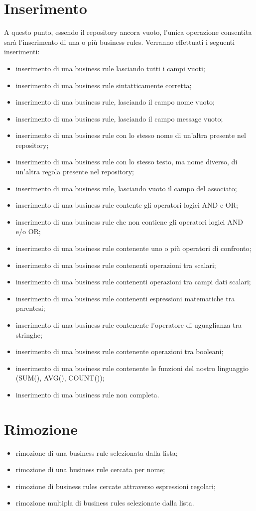 \chapter{Inserimento}
A questo punto, essendo il repository ancora vuoto, l'unica operazione consentita sar\`a l'inserimento di una o pi\`u business rules.
Verranno effettuati i seguenti inserimenti:
\begin{itemize}
\item inserimento di una business rule lasciando tutti i campi vuoti;
\item inserimento di una business rule sintatticamente corretta;
\item inserimento di una business rule, lasciando il campo nome vuoto;
\item inserimento di una business rule, lasciando il campo message vuoto;
\item inserimento di una business rule con lo stesso nome di un'altra presente nel repository;
\item inserimento di una business rule con lo stesso testo, ma nome diverso, di un'altra regola presente nel repository;
\item inserimento di una business rule, lasciando vuoto il campo del \bo associato;
\item inserimento di una business rule contente gli operatori logici AND e OR;
\item inserimento di una business rule che non contiene gli operatori logici AND e/o OR;
\item inserimento di una business rule contenente uno o pi\`u operatori di confronto;
\item inserimento di una business rule contenenti operazioni tra scalari;
\item inserimento di una business rule contenenti operazioni tra campi dati scalari;
\item inserimento di una business rule contenenti espressioni matematiche tra parentesi;
\item inserimento di una business rule contenente l'operatore di uguaglianza tra stringhe;
\item inserimento di una business rule contenente operazioni tra booleani;
\item inserimento di una business rule contenente le funzioni del nostro linguaggio (SUM(), AVG(), COUNT());
\item inserimento di una business rule non completa.
\end{itemize}
\chapter{Rimozione}
\begin{itemize}
\item rimozione di una business rule selezionata dalla lista;
\item rimozione di una business rule cercata per nome;
\item rimozione di business rules cercate attraverso espressioni regolari;
\item rimozione multipla di business rules selezionate dalla lista.
\end{itemize}
